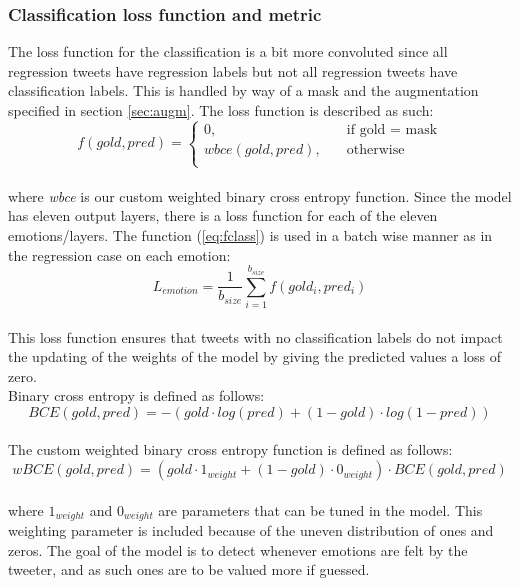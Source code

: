 \subsubsection{Classification loss function and metric}
The loss function for the classification is a bit more convoluted since all regression tweets have regression labels but not all regression tweets have classification labels. This is handled by way of a mask and the augmentation specified in section \ref{sec:augm}. The loss function is described as such:\\
\begin{equation} \label{eq:fclass}
f(gold,pred) =
     \begin{cases}
       0, &\quad\text{if gold = mask}\\
       wbce(gold,pred), &\quad\text{otherwise} \\
     \end{cases}
\end{equation}\\
where \textit{wbce} is our custom weighted binary cross entropy function. Since the model has eleven output layers, there is a loss function for each of the eleven emotions/layers. The function (\ref{eq:fclass}) is used in a batch wise manner as in the regression case on each emotion:\\
\begin{equation} \label{eq:lemotion}
L_{emotion}=\dfrac{1}{b_{size}} \sum_{i=1}^{b_{size}} f(gold_i, pred_i)
\end{equation}\\
 This loss function ensures that tweets with no classification labels do not impact the updating of the weights of the model by giving the predicted values a loss of zero.\\
Binary cross entropy is defined as follows:\\
\begin{equation}
BCE(gold,pred) = -(gold \cdot log(pred)+(1-gold) \cdot log(1-pred))
\end{equation}\\
The custom weighted binary cross entropy function is defined as follows:\\
\begin{equation}
wBCE(gold,pred) = (gold \cdot 1_{weight} + (1-gold) \cdot 0_{weight}) \cdot BCE(gold, pred)
\end{equation}\\
where $1_{weight}$ and $0_{weight}$ are parameters that can be tuned in the model. This weighting parameter is included because of the uneven distribution of ones and zeros. The goal of the model is to detect whenever emotions are felt by the tweeter, and as such ones are to be valued more if guessed.  \\ \\
